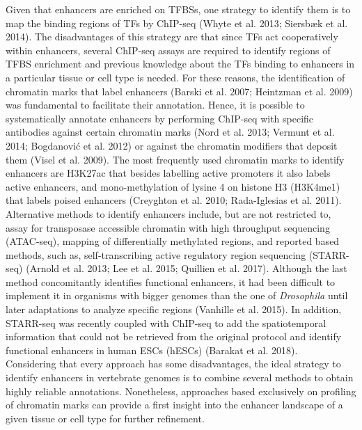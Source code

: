 Given that enhancers are enriched on TFBSs, one strategy to identify them is to map the binding regions of TFs by ChIP-seq (Whyte et al. 2013; Siersbæk et al. 2014). The disadvantages of this strategy are that since TFs act cooperatively within enhancers, several ChIP-seq assays are required to identify regions of TFBS enrichment and previous knowledge about the TFs binding to enhancers in a particular tissue or cell type is needed. For these reasons, the identification of chromatin marks that label enhancers (Barski et al. 2007; Heintzman et al. 2009) was fundamental to facilitate their annotation. Hence, it is possible to systematically annotate enhancers by performing ChIP-seq with specific antibodies against certain chromatin marks (Nord et al. 2013; Vermunt et al. 2014; Bogdanović et al. 2012) or against the chromatin modifiers that deposit them (Visel et al. 2009). The most frequently used chromatin marks to identify enhancers are H3K27ac that besides labelling active promoters it also labels active enhancers, and mono-methylation of lysine 4 on histone H3 (H3K4me1) that labels poised enhancers (Creyghton et al. 2010; Rada-Iglesias et al. 2011).\\

Alternative methods to identify enhancers include, but are not restricted to, assay for transposase accessible chromatin with high throughput sequencing (ATAC-seq), mapping of differentially methylated regions, and reported based methods, such as, self-transcribing active regulatory region sequencing (STARR-seq) (Arnold et al. 2013; Lee et al. 2015; Quillien et al. 2017). Although the last method concomitantly identifies functional enhancers, it had been difficult to implement it in organisms with bigger genomes than the one of \textit{Drosophila} until later adaptations to analyze specific regions (Vanhille et al. 2015). In addition, STARR-seq was recently coupled with ChIP-seq to add the spatiotemporal information that could not be retrieved from the original protocol and identify functional enhancers in human ESCs (hESCs) (Barakat et al. 2018).\\

Considering that every approach has some disadvantages, the ideal strategy to identify enhancers in vertebrate genomes is to combine several methods to obtain highly reliable annotations. Nonetheless, approaches based exclusively on profiling of chromatin marks can provide a first insight into the enhancer landscape of a given tissue or cell type for further refinement.\\

